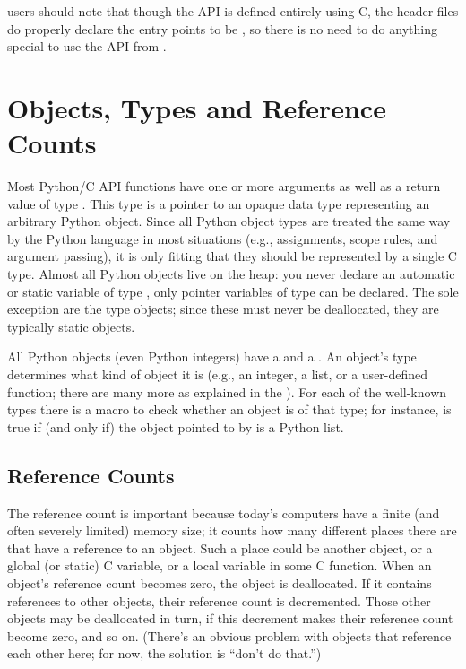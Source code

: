\documentclass{manual}
\begin{document}
\Cpp{} users should note that though the API is defined entirely using
C, the header files do properly declare the entry points to be
, so there is no need to do anything special to use
the API from \Cpp.


\section{Objects, Types and Reference Counts \label{objects}}

Most Python/C API functions have one or more arguments as well as a
return value of type .  This type is a pointer
to an opaque data type representing an arbitrary Python
object.  Since all Python object types are treated the same way by the
Python language in most situations (e.g., assignments, scope rules,
and argument passing), it is only fitting that they should be
represented by a single C type.  Almost all Python objects live on the
heap: you never declare an automatic or static variable of type
, only pointer variables of type  can 
be declared.  The sole exception are the type objects;
since these must never be deallocated, they are typically static
 objects.

All Python objects (even Python integers) have a  and a
.  An object's type determines what kind of object 
it is (e.g., an integer, a list, or a user-defined function; there are 
many more as explained in the ).  For each of the well-known types there is a macro
to check whether an object is of that type; for instance,
 is true if (and only if) the object
pointed to by  is a Python list.


\subsection{Reference Counts \label{refcounts}}

The reference count is important because today's computers have a 
finite (and often severely limited) memory size; it counts how many 
different places there are that have a reference to an object.  Such a 
place could be another object, or a global (or static) C variable, or 
a local variable in some C function.  When an object's reference count 
becomes zero, the object is deallocated.  If it contains references to 
other objects, their reference count is decremented.  Those other 
objects may be deallocated in turn, if this decrement makes their 
reference count become zero, and so on.  (There's an obvious problem 
with objects that reference each other here; for now, the solution is 
``don't do that.'')
\end{document}
